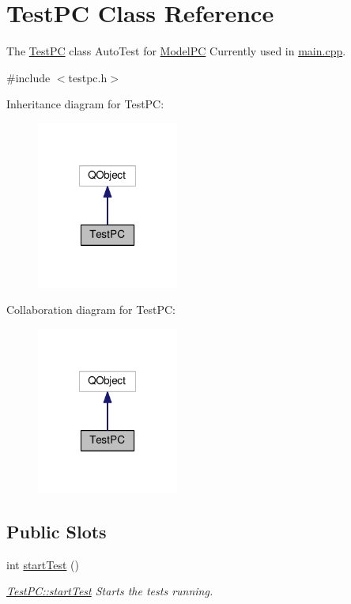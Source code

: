 \hypertarget{class_test_p_c}{\section{Test\-P\-C Class Reference}
\label{class_test_p_c}
}


The \hyperlink{class_test_p_c}{Test\-P\-C} class Auto\-Test for \hyperlink{class_model_p_c}{Model\-P\-C} Currently used in \hyperlink{main_8cpp}{main.\-cpp}.  




{\ttfamily \#include $<$testpc.\-h$>$}



Inheritance diagram for Test\-P\-C\-:
\nopagebreak
\begin{figure}[H]
\begin{center}
\leavevmode
\includegraphics[width=132pt]{class_test_p_c__inherit__graph}
\end{center}
\end{figure}


Collaboration diagram for Test\-P\-C\-:
\nopagebreak
\begin{figure}[H]
\begin{center}
\leavevmode
\includegraphics[width=132pt]{class_test_p_c__coll__graph}
\end{center}
\end{figure}
\subsection*{Public Slots}
\begin{DoxyCompactItemize}
\item 
int \hyperlink{class_test_p_c_ad0d724439a65d183d3d336b667cb867b}{start\-Test} ()
\begin{DoxyCompactList}\small\item\em \hyperlink{class_test_p_c_ad0d724439a65d183d3d336b667cb867b}{Test\-P\-C\-::start\-Test} Starts the tests running. \end{DoxyCompactList}\end{DoxyCompactItemize}
